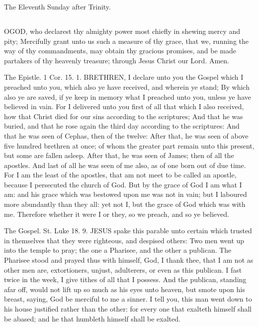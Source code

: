 The Eleventh Sunday after Trinity.
\subsection{}
OGOD, who declarest thy almighty power most chiefly in shewing mercy and pity; Mercifully grant unto us such a measure of thy grace, that we, running the way of thy commandments, may obtain thy gracious promises, and be made partakers of thy heavenly treasure; through Jesus Christ our Lord. Amen.


The Epistle. 1 Cor. 15. 1.
BRETHREN, I declare unto you the Gospel which I preached unto you, which also ye have received, and wherein ye stand; By which also ye are saved, if ye keep in memory what I preached unto you, unless ye have believed in vain. For I delivered unto you first of all that which I also received, how that Christ died for our sins according to the scriptures; And that he was buried, and that he rose again the third day according to the scriptures: And that he was seen of Cephas, then of the twelve: After that, he was seen of above five hundred brethren at once; of whom the greater part remain unto this present, but some are fallen asleep. After that, he was seen of James; then of all the apostles. And last of all he was seen of me also, as of one born out of due time. For I am the least of the apostles, that am not meet to be called an apostle, because I persecuted the church of God. But by the grace of God I am what I am: and his grace which was bestowed upon me was not in vain; but I laboured more abundantly than they all: yet not I, but the grace of God which was with me. Therefore whether it were I or they, so we preach, and so ye believed.


The Gospel. St. Luke 18. 9.
JESUS spake this parable unto certain which trusted in themselves that they were righteous, and despised others: Two men went up into the temple to pray; the one a Pharisee, and the other a publican. The Pharisee stood and prayed thus with himself, God, I thank thee, that I am not as other men are, extortioners, unjust, adulterers, or even as this publican. I fast twice in the week, I give tithes of all that I possess. And the publican, standing afar off, would not lift up so much as his eyes unto heaven, but smote upon his breast, saying, God be merciful to me a sinner. I tell you, this man went down to his house justified rather than the other: for every one that exalteth himself shall be abased; and he that humbleth himself shall be exalted.


